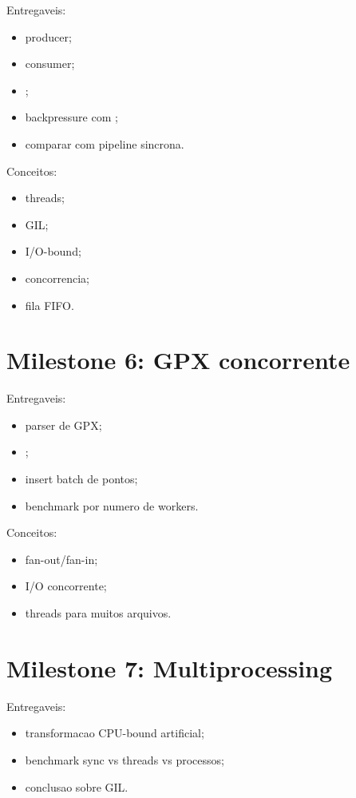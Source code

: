 Entregaveis:

\begin{itemize}
  \item producer;
  \item consumer;
  \item {};
  \item backpressure com ;
  \item comparar com pipeline sincrona.
\end{itemize}

Conceitos:

\begin{itemize}
  \item threads;
  \item GIL;
  \item I/O-bound;
  \item concorrencia;
  \item fila FIFO.
\end{itemize}

\section{Milestone 6: GPX concorrente}

Entregaveis:

\begin{itemize}
  \item parser de GPX;
  \item {};
  \item insert batch de pontos;
  \item benchmark por numero de workers.
\end{itemize}

Conceitos:

\begin{itemize}
  \item fan-out/fan-in;
  \item I/O concorrente;
  \item threads para muitos arquivos.
\end{itemize}

\section{Milestone 7: Multiprocessing}

Entregaveis:

\begin{itemize}
  \item transformacao CPU-bound artificial;
  \item benchmark sync vs threads vs processos;
  \item conclusao sobre GIL.
\end{itemize}

